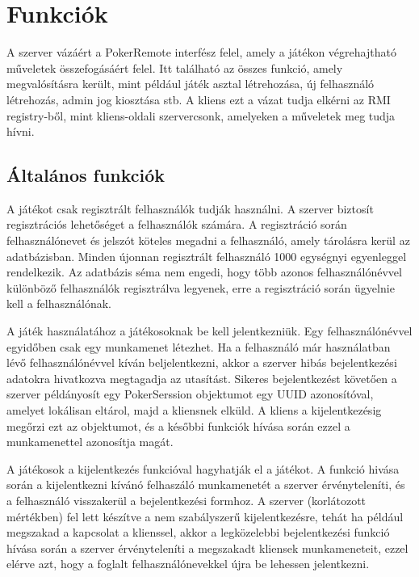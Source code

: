 \section{Funkciók}
A szerver vázáért a PokerRemote interfész felel, amely a játékon végrehajtható műveletek összefogásáért felel. Itt található az összes funkció, amely megvalósításra került, mint például játék asztal létrehozása, új felhasználó létrehozás, admin jog kiosztása stb. A kliens ezt a vázat tudja elkérni az RMI registry-ből, mint kliens-oldali szervercsonk, amelyeken a műveletek meg tudja hívni.
\subsection{Általános funkciók}

A játékot csak regisztrált felhasználók tudják használni. A szerver biztosít regisztrációs lehetőséget a felhasználók számára. A regisztráció során felhasználónevet és jelszót köteles megadni a felhasználó, amely tárolásra kerül az adatbázisban. Minden újonnan regisztrált felhasználó 1000 egységnyi egyenleggel rendelkezik. Az adatbázis séma nem engedi, hogy több azonos felhasználónévvel különböző felhasználók regisztrálva legyenek, erre a regisztráció során ügyelnie kell a felhasználónak.

A játék használatához a játékosoknak be kell jelentkezniük. Egy felhasználónévvel egyidőben csak egy munkamenet létezhet. Ha a felhasználó már használatban lévő felhasználónévvel kíván beljelentkezni, akkor a szerver hibás bejelentkezési adatokra hivatkozva megtagadja az utasítást. Sikeres bejelentkezést követően a szerver példányosít egy PokerSerssion objektumot egy UUID \cite{uuid} azonosítóval, amelyet lokálisan eltárol, majd a kliensnek elküld. A kliens a kijelentkezésig megőrzi ezt az objektumot, és a későbbi funkciók hívása során ezzel a munkamenettel azonosítja magát.

A játékosok a kijelentkezés funkcióval hagyhatják el a játékot. A funkció hivása során a kijelentkezni kívánó felhaszáló munkamenetét a szerver érvényteleníti, és a felhasználó visszakerül a bejelentkezési formhoz. A szerver (korlátozott mértékben) fel lett készítve a nem szabályszerű kijelentkezésre, tehát ha például megszakad a kapcsolat a klienssel, akkor a legközelebbi bejelentkezési funkció hívása során a szerver érvényteleníti a megszakadt kliensek munkameneteit, ezzel elérve azt, hogy a foglalt felhasználónevekkel újra be lehessen jelentkezni.

